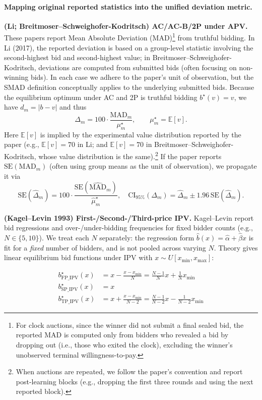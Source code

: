 \documentclass[acmsmall,screen,review]{acmart}
\begin{document}
\paragraph{Mapping original reported statistics into the unified deviation metric.}

\textbf{(Li; Breitmoser--Schweighofer-Kodritsch) AC/AC-B/2P under APV.}
These papers report Mean Absolute Deviation (MAD)\footnote{For clock auctions, since the winner did not submit a final sealed bid, the reported MAD is computed only from bidders who revealed a bid by dropping out (i.e., those who exited the clock), excluding the winner's unobserved terminal willingness-to-pay.}
 from truthful bidding. In Li (2017), the reported deviation is based on a group-level statistic involving the second-highest bid and second-highest value; in Breitmoser--Schweighofer-Kodritsch, deviations are computed from submitted bids (often focusing on non-winning bids). In each case we adhere to the paper's unit of observation, but the SMAD definition conceptually applies to the underlying submitted bids.
Because the equilibrium optimum under AC and 2P is truthful bidding $b^\star(v)=v$, we have $d_m=|b-v|$ and thus
\[
\Delta_m = 100\cdot \frac{\mathrm{MAD}_m}{\mu_m^\star},
\qquad
\mu_m^\star=\mathbb E[v].
\]
Here $\mathbb E[v]$ is implied by the experimental value distribution reported by the paper (e.g., $\mathbb E[v]=70$ in Li; and $\mathbb E[v]=70$ in Breitmoser--Schweighofer-Kodritsch, whose value distribution is the same).\footnote{When auctions are repeated, we follow the paper's convention and report post-learning blocks (e.g., dropping the first three rounds and using the next reported block).}
If the paper reports $\mathrm{SE}(\mathrm{MAD}_m)$ (often using group means as the unit of observation), we propagate it via
\[
\mathrm{SE}(\widehat{\Delta}_m)=100\cdot \frac{\mathrm{SE}(\widehat{\mathrm{MAD}}_m)}{\widehat{\mu}_m^\star},
\quad
\mathrm{CI}_{95\%}(\Delta_m)=\widehat{\Delta}_m \pm 1.96\,\mathrm{SE}(\widehat{\Delta}_m).
\]

\textbf{(Kagel--Levin 1993) First-/Second-/Third-price IPV.}
Kagel--Levin report bid regressions and over-/under-bidding frequencies for fixed bidder counts (e.g., $N\in\{5,10\}$). We treat each $N$ separately: the regression form $\hat b(x)=\hat\alpha+\hat\beta x$ is fit for a \emph{fixed} number of bidders, and is not pooled across varying $N$.
Theory gives linear equilibrium bid functions under IPV with $x\sim U[x_{\min},x_{\max}]$:

$$\begin{aligned}
b^\star_{\mathrm{FP\_IPV}}(x) &= x - \frac{x-x_{\min}}{N} = \frac{N-1}{N}x + \frac{1}{N}x_{\min} \\
b^\star_{\mathrm{SP\_IPV}}(x) &= x \\
b^\star_{\mathrm{TP\_IPV}}(x) &= x + \frac{x-x_{\min}}{N-2} = \frac{N-1}{N-2}x - \frac{1}{N-2}x_{\min}
\end{aligned}$$
\end{document}
